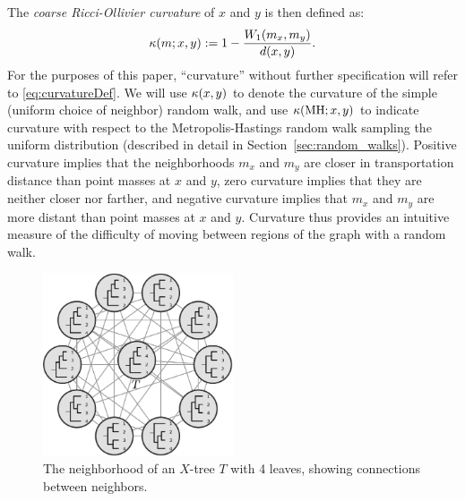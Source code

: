 \documentclass[10pt,twoside,leqno,twocolumn]{article}
\let\MYoriglatexcaption\caption
\renewcommand{\caption}[2][\relax]{\MYoriglatexcaption[#2]{#2}}
\newcommand{\MH}{\operatorname{MH}}
\newcommand{\cuttable}[2][]{%
    \ifthenelse{\equal{#1}{}}%
		{}%
		{#1}%
}
\newcommand{\curvature}[2][]{%
    \ifthenelse{\equal{#1}{}}%
		{\kappa(#2)}%
		{\kappa_{#1}(#2)}%
}
\begin{document}
The \emph{coarse Ricci-Ollivier curvature} of $x$ and $y$ is then defined as:
\vspace{-0.5em}
\begin{equation}
\curvature{m; x, y} := 1 - \frac{W_1(m_x, m_y)}{d(x, y)}.
\label{eq:curvatureDef}
\end{equation}
For the purposes of this paper, ``curvature'' without further specification will refer to \eqref{eq:curvatureDef}.
We will use $\curvature{x,y}$ to denote the curvature of the simple (uniform choice of neighbor) random walk, and use $\curvature{\MH; x,y}$ to indicate curvature with respect to the Metropolis-Hastings random walk sampling the uniform distribution (described in detail in Section~\ref{sec:random_walks}).
Positive curvature implies that the neighborhoods $m_x$ and $m_y$ are closer in transportation distance than point masses at $x$ and $y$, zero curvature implies that they are neither closer nor farther, and negative curvature implies that $m_x$ and $m_y$ are more distant than point masses at $x$ and $y$.
Curvature thus provides an intuitive measure of the difficulty of moving between regions of the graph with \cuttable[a]{the given} random walk.
\begin{figure}[!h]
	\includegraphics[width=0.5\textwidth]{figs/neighborhood}
	\caption{The neighborhood of an $X$-tree $T$ with 4 leaves, showing connections between neighbors.}
	\label{fig:neighborhood}
\end{figure}
\vspace{0.1em} 

\pagebreak
\end{document}
